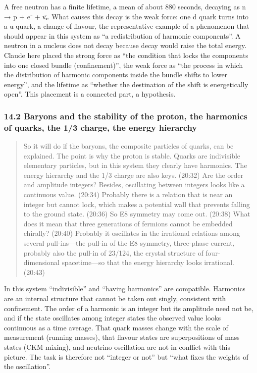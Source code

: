 \documentclass[
  a4paper,
]{article}
\begin{document}
A free neutron has a finite lifetime, a mean of about 880 seconds,
decaying as n → p + e⁻ + ν̄ₑ. What causes this decay is the weak force:
one d quark turns into a u quark, a change of flavour, the
representative example of a phenomenon that should appear in this system
as ``a redistribution of harmonic components''. A neutron in a nucleus
does not decay because decay would raise the total energy. Claude here
placed the strong force as ``the condition that locks the components
into one closed bundle (confinement)'', the weak force as ``the process
in which the distribution of harmonic components inside the bundle
shifts to lower energy'', and the lifetime as ``whether the destination
of the shift is energetically open''. This placement is a connected
part, a hypothesis.

\subsubsection{14.2 Baryons and the stability of the proton, the
harmonics of quarks, the 1/3 charge, the energy
hierarchy}\label{baryons-and-the-stability-of-the-proton-the-harmonics-of-quarks-the-13-charge-the-energy-hierarchy}

\begin{quote}
So it will do if the baryons, the composite particles of quarks, can be
explained. The point is why the proton is stable. Quarks are indivisible
elementary particles, but in this system they clearly have harmonics.
The energy hierarchy and the 1/3 charge are also keys. (20:32) Are the
order and amplitude integers? Besides, oscillating between integers
looks like a continuous value. (20:34) Probably there is a relation that
is near an integer but cannot lock, which makes a potential wall that
prevents falling to the ground state. (20:36) So E8 symmetry may come
out. (20:38) What does it mean that three generations of fermions cannot
be embedded chirally? (20:40) Probably it oscillates in the irrational
relations among several pull-ins---the pull-in of the E8 symmetry,
three-phase current, probably also the pull-in of 23/124, the crystal
structure of four-dimensional spacetime---so that the energy hierarchy
looks irrational. (20:43)
\end{quote}

In this system ``indivisible'' and ``having harmonics'' are compatible.
Harmonics are an internal structure that cannot be taken out singly,
consistent with confinement. The order of a harmonic is an integer but
its amplitude need not be, and if the state oscillates among integer
states the observed value looks continuous as a time average. That quark
masses change with the scale of measurement (running masses), that
flavour states are superpositions of mass states (CKM mixing), and
neutrino oscillation are not in conflict with this picture. The task is
therefore not ``integer or not'' but ``what fixes the weights of the
oscillation''.
\end{document}

